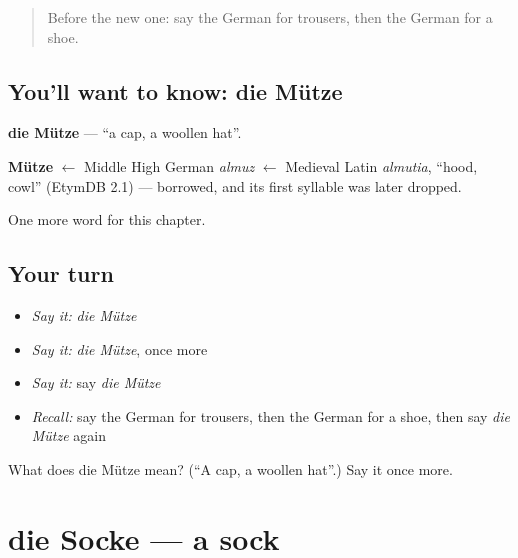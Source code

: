 \label{lesson:GE-C99-muetze}



\begin{quote}
Before the new one: say the German for trousers, then the German for a shoe.
\end{quote}

\subsection*{You'll want to know: die Mütze}
\textbf{die Mütze} — \textquotedblleft{}a cap, a woollen hat\textquotedblright{}.

\begin{cousinweb}
\textbf{Mütze} $\leftarrow$ Middle High German \emph{almuz} $\leftarrow$ Medieval Latin \emph{almutia}, \textquotedblleft{}hood, cowl\textquotedblright{} (EtymDB 2.1) — borrowed, and its first syllable was later dropped.
\end{cousinweb}

\begin{grammarlens}[title={What you've built}]
One more word for this chapter.
\end{grammarlens}

\subsection*{Your turn}
\begin{itemize}
\raggedright
  \item \emph{Say it:} \emph{die Mütze}
  \item \emph{Say it:} \emph{die Mütze}, once more
  \item \emph{Say it:} say \emph{die Mütze}
  \item \emph{Recall:} say the German for trousers, then the German for a shoe, then say \emph{die Mütze} again
\end{itemize}

\begin{tcolorbox}[breakable,colback=teal!4,colframe=teal!35!black,title={Before you move on}]
What does die Mütze mean? (\textquotedblleft{}A cap, a woollen hat\textquotedblright{}.) Say it once more.
\end{tcolorbox}
\section[die Socke]{die Socke — a sock}

\label{lesson:GE-C99-socke}



